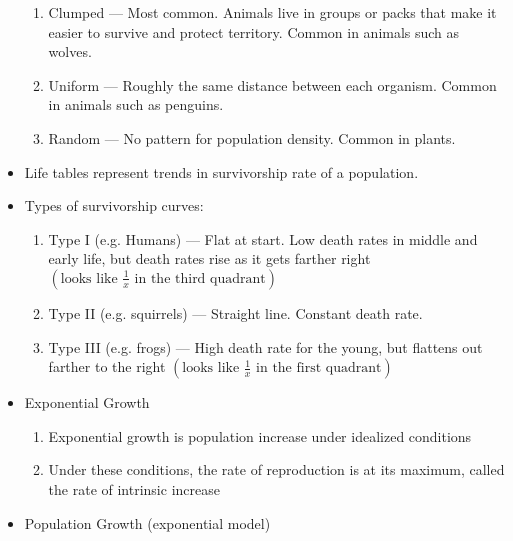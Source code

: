 \documentclass[12pt]{article}
\begin{document}
\begin{itemize}
\begin{enumerate}
      \item Clumped — Most common. Animals live in groups or packs that make it easier to survive and protect territory. Common in animals such as wolves.

      \item Uniform — Roughly the same distance between each organism. Common in animals such as penguins. 

      \item Random — No pattern for population density. Common in plants.

    \end{enumerate}

  \item Life tables represent trends in survivorship rate of a population.

  \item Types of survivorship curves:

    \begin{enumerate}

      \item Type I (e.g. Humans) — Flat at start. Low death rates in middle and early life, but death rates rise as it gets farther right $\left(\text{looks like }\frac{1}{x}\text{ in the third quadrant}\right)$

      \item Type II (e.g. squirrels) — Straight line. Constant death rate.

      \item Type III (e.g. frogs) — High death rate for the young, but flattens out farther to the right $\left(\text{looks like }\frac{1}{x}\text{ in the first quadrant} \right)$

    \end{enumerate}

  \item Exponential Growth

    \begin{enumerate}

      \item Exponential growth is population increase under idealized conditions

      \item Under these conditions, the rate of reproduction is at its maximum, called the rate of intrinsic increase

    \end{enumerate}

  \item Population Growth (exponential model)


\end{itemize}
\end{document}
